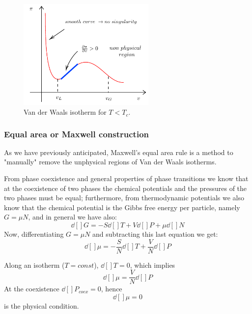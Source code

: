 \documentclass[../main/main.tex]{subfiles}
\begin{document}
\begin{figure}[h!]
\centering
\includegraphics[width=0.6\textwidth]{../lessons/14_image/4.pdf}
\caption{\label{fig:14_3} Van der Waals isotherm for \(T<T_c\).}
\end{figure}


\subsubsection{Equal area or Maxwell construction}
As we have previously anticipated, Maxwell's equal area rule is a method to "manually" remove the unphysical regions of Van der Waals isotherms.

From phase coexistence and general properties of phase transitions we know that at the coexistence of two phases the chemical potentials and the pressures of the two phases must be equal;  furthermore, from thermodynamic potentials we also know that the chemical potential is the Gibbs free energy per particle, namely \(G=\mu N \), and in general we have also:
\begin{equation*}
    \dd[]{G} = - S \dd[]{T} + V \dd[]{P} + \mu \dd[]{N}
\end{equation*}
Now, differentiating \(G=\mu N\) and subtracting this last equation we get:
\begin{equation}
  \dd[]{\mu } = - \frac{S}{N} \dd[]{T} + \frac{V}{N} \dd[]{P}
\end{equation}

Along an isotherm (\( T=const \)), \( \dd[]{T} = 0  \), which implies
\begin{equation}
  \dd[]{\mu } = \frac{V}{N} \dd[]{P}
\end{equation}
At the coexistence \( \dd[]{P}_{coex} = 0  \), hence
\begin{equation}
  \dd[]{\mu } = 0
\end{equation}
is the physical condition.
\end{document}
